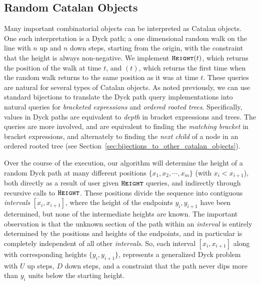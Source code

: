 \subsection{Random Catalan Objects}
\label{sec:overview_catalan_objects}
Many important combinatorial objects can be interpreted as Catalan objects.
One such interpretation is a Dyck path; a one dimensional random walk on the line with $n$ up and $n$ down steps, starting from the origin,
with the constraint that the height is always non-negative.
We implement $\texttt{\textsc{Height}}(t)$, which returns the position of the walk at time $t$,
and $(t)$, which returns the first time when the random walk returns to the same position as it was at time $t$.
These queries are natural for several types of Catalan objects.
As noted previously, we can use standard bijections to translate the Dyck path query implementations into
natural queries for \emph{bracketed expressions} and \emph{ordered rooted trees}.
Specifically,  values in Dyck paths are equivalent to \emph{depth} in bracket expressions and trees.
The  queries are more involved, and are equivalent to finding the \emph{matching bracket} in bracket expressions,
and alternately to finding the \emph{next child} of a node in an ordered rooted tree (see Section~\ref{sec:bijections_to_other_catalan_objects}).

Over the course of the execution, our algorithm will determine the height of a random Dyck path at many different positions $\{ x_1, x_2,\cdots, x_m\}$
(with $x_i<x_{i+1}$), both directly as a result of user given $\texttt{\textsc{Height}}$ queries, and indirectly through recursive calls to $\texttt{\textsc{Height}}$.
These positions divide the sequence into contiguous \emph{intervals} $[x_i,x_{i+1}]$,
where the height of the endpoints $y_i, y_{i+1}$ have been determined, but none of the intermediate heights are known.
The important observation is that the unknown section of the path within an \emph{interval}
is entirely determined by the positions and heights of the endpoints, and in particular is completely independent of all other \emph{intervals}.
So, each interval $[x_i,x_{i+1}]$ along with corresponding heights $\{y_i,y_{i+1}\}$,
represents a generalized Dyck problem with $U$ up steps, $D$ down steps,
and a constraint that the path never dips more than $y_i$ units below the starting height.

